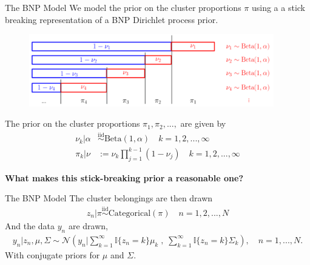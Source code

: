 \documentclass[10pt]{beamer}\usepackage[]{graphicx}\usepackage[]{color}
\begin{document}
\begin{frame}{The BNP Model}
We model the prior on the cluster proportions $\pi$ using a
a stick breaking representation of a BNP Dirichlet process prior.
\vspace{-0.1in}
\begin{figure}[!h]
\centering
\includegraphics[width = 0.95\textwidth]{./figures/DP_stick_breaking.png}
\end{figure}
\vspace{-0.1in}
The prior on the cluster proportions $\pi_1, \pi_2, ..., $ are given by
%
\begin{align*}
\nu_k \vert \alpha &\overset{\text{iid}}{\sim} \text{Beta}\left(1, \alpha \right)\quad k = 1, 2, ..., \infty \\
\pi_k | \nu &:= \nu_k \prod_{j=1}^{k-1} (1 - \nu_j) \quad k = 1, 2, ..., \infty
\end{align*}
%
\vspace{-0.1in}\pause 
%
\begin{mdframed}[style=MyFrame]
\begin{center}
{\bf What makes this stick-breaking prior a reasonable one?}
\end{center}
\end{mdframed}

\end{frame}

\begin{frame}{The BNP Model}
The cluster belongings are then drawn
\begin{align*}
  z_n \vert \pi \overset{\text{iid}}{\sim} \mathrm{Categorical}(\pi)
  \quad n = 1, 2, ..., N
\end{align*}
%
And the data $y_n$ are drawn,
\begin{align*}
	y_n | z_n, \mu, \Sigma \sim
        \mathcal{N}\left(
            y_n \Big\vert
                \sum_{k=1}^\infty \mathbb{I}\{z_n = k\} \mu_k \;,
              \; \sum_{k=1}^\infty \mathbb{I}\{z_n = k\} \Sigma_k\right),
	\quad n = 1, ..., N.
\end{align*}
%
With conjugate priors for $\mu$ and $\Sigma$.

\end{frame}
\end{document}
